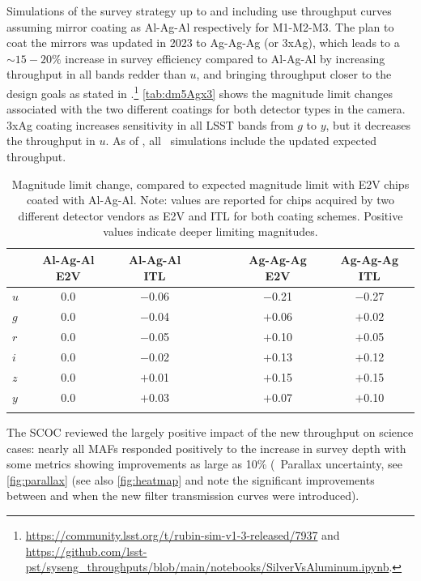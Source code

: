 Simulations of the survey strategy up to and including  use throughput curves assuming mirror coating as Al-Ag-Al respectively for M1-M2-M3. The plan to coat the mirrors was updated in 2023 to Ag-Ag-Ag (or 3xAg), which leads to a $\sim15-20\%$ increase in survey efficiency compared to Al-Ag-Al by increasing throughput in all bands redder than $u$, and bringing throughput closer to the design goals as stated in .\footnote{\url{https://community.lsst.org/t/rubin-sim-v1-3-released/7937} and \url{https://github.com/lsst-pst/syseng_throughputs/blob/main/notebooks/SilverVsAluminum.ipynb}.}  \autoref{tab:dm5Agx3} shows the magnitude limit changes associated with the two different coatings for both detector types in the camera.  3xAg coating increases sensitivity in all LSST bands from $g$ to $y$, but it decreases the throughput in $u$.  As of , all \opsim\ simulations include the updated expected throughput.

\begin{longtable}{lccccc}
 \\\hline
& Al-Ag-Al E2V &	Al-Ag-Al ITL & &		Ag-Ag-Ag E2V &		Ag-Ag-Ag ITL\\
\hline
$u$	 &	0.0	 &	$-$0.06 &	$\qquad$ &	$-$0.21 &   $-$0.27\\
$g$	 &	0.0	 &	$-$0.04 &	$\qquad$ &	$+$0.06 &	$+$0.02\\
$r$	 &	0.0	 &	$-$0.05 &	$\qquad$ &   $+$0.10 &	$+$0.05\\
$i$	 &	0.0	 &	$-$0.02 &	$\qquad$ &	$+$0.13 &	$+$0.12\\
$z$	 &	0.0	 &	$+$0.01  &	$\qquad$ &	$+$0.15  &	$+$0.15\\
$y$	 &	0.0	 &	$+$0.03  &	$\qquad$ &	$+$0.07  &	$+$0.10\\
\caption{Magnitude limit change, compared to expected magnitude limit with E2V chips coated with Al-Ag-Al. Note: values are reported for chips acquired by two different detector vendors as E2V and ITL for both coating schemes. Positive values indicate deeper limiting magnitudes.
}\label{tab:dm5Agx3}
\end{longtable}

The SCOC reviewed the largely positive impact of the new throughput on science cases: nearly all MAFs responded positively to the increase in survey depth with some metrics showing improvements as large as 10\% (\eg\ Parallax uncertainty, see \autoref{fig:parallax} (see also \autoref{fig:heatmap} and note the significant improvements between  and  when the new filter transmission curves were introduced). 

